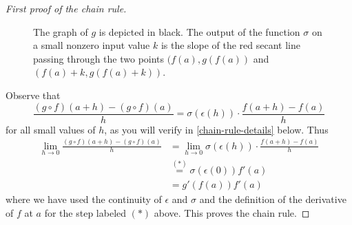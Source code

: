 \begin{proof}[First proof of the chain rule]
	\begin{figure}
		\begin{center}
		\end{center}
		\caption{The graph of $g$ is depicted in black. The output of the function $\sigma$ on a small nonzero input value $k$ is the slope of the red secant line passing through the two points $(f(a), g(f(a))$ and $(f(a)+k, g(f(a)+k))$. }  \label{slope-function-chain-rule}
	\end{figure}
	
	
	Observe that
	\begin{equation} \label{alternative-to-multiplicative-cross-term} \frac{(g \circ f)(a+h) - (g \circ f)(a)}{h} = \sigma(\epsilon(h)) \cdot \frac{f(a+h)-f(a)}{h} \end{equation}
	for all small values of $h$, as you will verify in \cref{chain-rule-details} below. Thus
	\[ \begin{aligned} \lim_{h \to 0} \frac{(g \circ f)(a+h) - (g \circ f)(a)}{h} &= \lim_{h \to 0} \sigma (\epsilon(h)) \cdot \frac{f(a+h)-f(a)}{h} \\ 
	&\stackrel{(*)}{=} \sigma (\epsilon(0)) f'(a) \\
	&= g'(f(a)) f'(a) \end{aligned}  \]
	where we have used the continuity of $\epsilon$ and $\sigma$ and the definition of the derivative of $f$ at $a$ for the step labeled $(*)$ above. This proves the chain rule. 
\end{proof}
	
